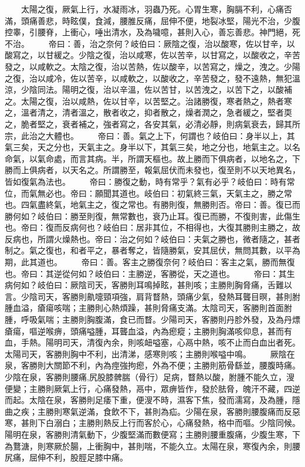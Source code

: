 　　太陽之復，厥氣上行，水凝雨冰，羽蟲乃死。心胃生寒，胸膈不利，心痛否滿，頭痛善悲，時眩僕，食減，腰脽反痛，屈伸不便，地裂冰堅，陽光不治，少腹控睾，引腰脊，上衝心，唾出清水，及為噦噫，甚則入心，善忘善悲。神門絕，死不治。
　　帝曰：善，治之奈何？岐伯曰：厥陰之復，治以酸寒，佐以甘辛，以酸寫之，以甘緩之。少陰之復，治以咸寒，佐以苦辛，以甘寫之，以酸收之，辛苦發之，以咸軟之。太陰之復，治以苦熱，佐以酸辛，以苦寫之，燥之，洩之。少陽之復，治以咸冷，佐以苦辛，以咸軟之，以酸收之，辛苦發之，發不遠熱，無犯溫涼，少陰同法。陽明之復，治以辛溫，佐以苦甘，以苦洩之，以苦下之，以酸補之。太陽之復，治以咸熱，佐以甘辛，以苦堅之。治諸勝復，寒者熱之，熱者寒之，溫者清之，清者溫之，散者收之，抑者散之，燥者潤之，急者緩之，堅者耎之，脆者堅之，衰者補之，強者寫之，各安其氣，必清必靜，則病氣衰去，歸其所宗，此治之大體也。
　　帝曰：善。氣之上下，何謂也？岐伯曰：身半以上，其氣三矣，天之分也，天氣主之。身半以下，其氣三矣，地之分也，地氣主之。以名命氣，以氣命處，而言其病。半，所謂天樞也。故上勝而下俱病者，以地名之，下勝而上俱病者，以天名之。所謂勝至，報氣屈伏而未發也，復至則不以天地異名，皆如復氣為法也。
　　帝曰：勝復之動，時有常乎？氣有必乎？岐伯曰：時有常位，而氣無必也。帝曰：願聞其道也。岐伯曰：初氣終三氣，天氣主之，勝之常也。四氣盡終氣，地氣主之，復之常也。有勝則復，無勝則否。帝曰：善。復已而勝何如？岐伯曰：勝至則復，無常數也，衰乃止耳。復已而勝，不復則害，此傷生也。帝曰：復而反病何也？岐伯曰：居非其位，不相得也，大復其勝則主勝之，故反病也，所謂火燥熱也。帝曰：治之何如？岐伯曰：夫氣之勝也，微者隨之，甚者制之。氣之復也，和者平之，暴者奪之，皆隨勝氣，安其屈伏，無問其數，以平為期，此其道也。
　　帝曰：善。客主之勝復奈何？岐伯曰：客主之氣，勝而無復也。帝曰：其逆從何如？岐伯曰：主勝逆，客勝從，天之道也。
　　帝曰：其生病何如？岐伯曰：厥陰司天，客勝則耳鳴掉眩，甚則咳；主勝則胸脅痛，舌難以言。少陰司天，客勝則鼽嚏頸項強，肩背瞀熱，頭痛少氣，發熱耳聾目暝，甚則胕腫血溢，瘡瘍咳喘；主勝則心熱煩躁，甚則脅痛支滿。太陰司天，客勝則首面胕腫，呼吸氣喘；主勝則胸腹滿，食已而瞀。少陽司天，客勝則丹胗外發，及為丹熛瘡瘍，嘔逆喉痹，頭痛嗌腫，耳聾血溢，內為瘛瘲；主勝則胸滿咳仰息，甚而有血，手熱。陽明司天，清復內余，則咳衄嗌塞，心鬲中熱，咳不止而白血出者死。太陽司天，客勝則胸中不利，出清涕，感寒則咳；主勝則喉嗌中鳴。
　　厥陰在泉，客勝則大關節不利，內為痙強拘瘛，外為不便；主勝則筋骨繇並，腰腹時痛。少陰在泉，客勝則腰痛,尻股膝髀腨（骨行）足病，瞀熱以酸，胕腫不能久立，溲便變；主勝則厥氣上行，心痛發熱，鬲中，眾痹皆作，發於胠脅，魄汗不藏，四逆而起。太陰在泉，客勝則足痿下重，便溲不時，濕客下焦，發而濡寫，及為腫，隱曲之疾；主勝則寒氣逆滿，食飲不下，甚則為疝。少陽在泉，客勝則腰腹痛而反惡寒，甚則下白溺白；主勝則熱反上行而客於心，心痛發熱，格中而嘔。少陰同候。陽明在泉，客勝則清氣動下，少腹堅滿而數便寫；主勝則腰重腹痛，少腹生寒，下為鶩溏，則寒厥於腸，上衝胸中，甚則喘，不能久立。太陽在泉，寒復內余，則腰尻痛，屈伸不利，股脛足膝中痛。
